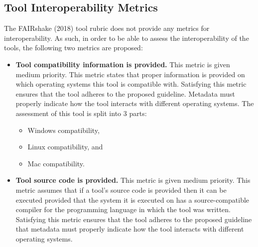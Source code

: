 \documentclass{cisfyp}
\begin{document}
\subsection{Tool Interoperability Metrics}
The FAIRshake (2018) tool rubric does not provide any metrics for interoperability. As such, in order to be able to assess the interoperability of the tools, the following two metrics are proposed:
\begin{itemize}
	\item \textbf{Tool compatibility information is provided.}\newline
	This metric is given medium priority. This metric states that proper information is provided on which operating systems this tool is compatible with. Satisfying this metric ensures that the tool adheres to the proposed guideline. Metadata must properly indicate how the tool interacts with different operating systems. The 
	assessment of this tool is split into 3 parts:
	\begin{itemize}
		\item Windows compatibility,
		\item Linux compatibility, and
		\item Mac compatibility.
	\end{itemize}
	\item \textbf{Tool source code is provided.}\newline
	This metric is given medium priority. This metric assumes that if a tool's source code is provided then it can be executed provided that the system it is executed on has a source-compatible compiler for the programming language in which the tool was written. Satisfying this metric ensures that the tool adheres to the proposed guideline that metadata must properly indicate how the tool interacts with different operating systems.
\end{itemize}
\end{document}
